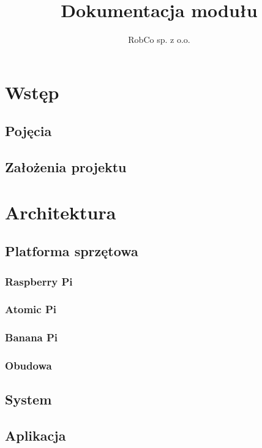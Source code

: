 \documentclass[
12pt, %
a4paper
]{report}
\title{Dokumentacja modułu}
\author{RobCo sp. z o.o.}
\newcommand\blankpage{%
    \null
    \thispagestyle{empty}%
    \addtocounter{page}{-1}%
    \newpage
}
\begin{document}
			


	

	\afterpage{\blankpage}
	
	

	\chapter{Wstęp}
        \section{Pojęcia}
		
		\section{Założenia projektu} 
		
		
    \chapter{Architektura}
        \section{Platforma sprzętowa}
        
            \subsection{Raspberry Pi}
            
            \subsection{Atomic Pi}
            
            \subsection{Banana Pi}
            
            \subsection{Obudowa}
            
        \section{System} 
        
        \section{Aplikacja} 
        
\end{document}
